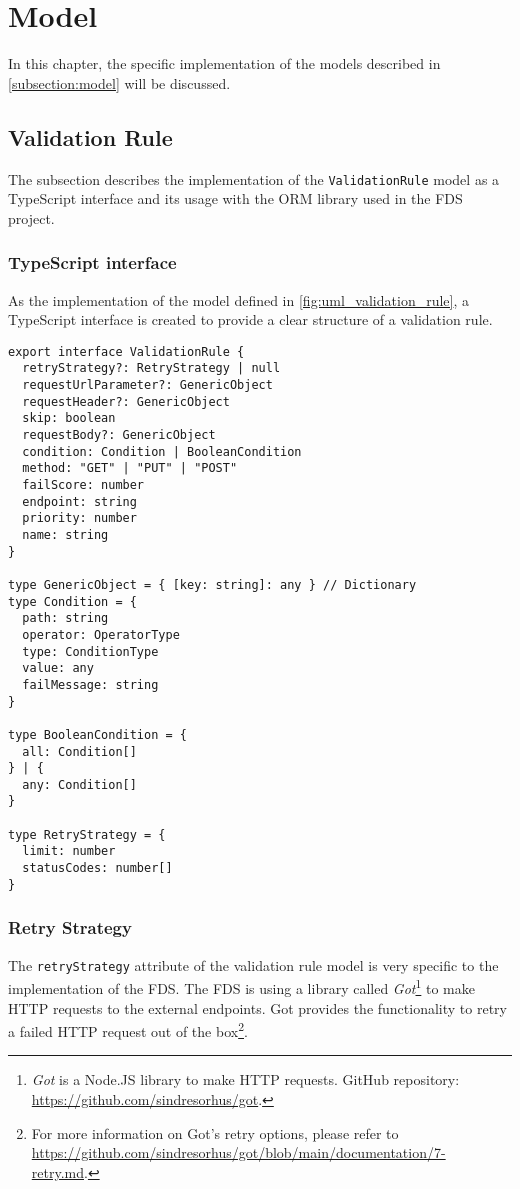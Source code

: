 \section{Model}
  \label{impl_model}

In this chapter, the specific implementation of the models described in \autoref{subsection:model} will be discussed. 

  \subsection{Validation Rule}
    \label{impl_model:rule}

    The subsection describes the implementation of the \verb;ValidationRule; model as a TypeScript interface and its usage with the ORM library used in the FDS project. 

    \subsubsection{TypeScript interface}
      As the implementation of the model defined in \autoref{fig:uml_validation_rule}, a TypeScript interface is created to provide a clear structure of a validation rule.

      \begin{lstlisting}[style=es6, caption={TypeScript interface of a validation rule (TypeScript)}]
export interface ValidationRule {
  retryStrategy?: RetryStrategy | null
  requestUrlParameter?: GenericObject
  requestHeader?: GenericObject
  skip: boolean
  requestBody?: GenericObject
  condition: Condition | BooleanCondition
  method: "GET" | "PUT" | "POST" 
  failScore: number
  endpoint: string
  priority: number
  name: string
}

type GenericObject = { [key: string]: any } // Dictionary
type Condition = {
  path: string
  operator: OperatorType
  type: ConditionType
  value: any
  failMessage: string
}

type BooleanCondition = {
  all: Condition[]
} | {
  any: Condition[]
}

type RetryStrategy = {
  limit: number
  statusCodes: number[] 
}
      \end{lstlisting}
 
    \subsubsection{Retry Strategy}
      \label{impl_model:rule__retry}

      The \verb;retryStrategy; attribute of the validation rule model is very specific to the implementation of the FDS. The FDS is using a library called \emph{Got}\footnote{\emph{Got} is a Node.JS library to make HTTP requests. GitHub repository: \url{https://github.com/sindresorhus/got}.} to make HTTP requests to the external endpoints. Got provides the functionality to retry a failed HTTP request out of the box\footnote{For more information on Got's retry options, please refer to \url{https://github.com/sindresorhus/got/blob/main/documentation/7-retry.md}.}.

